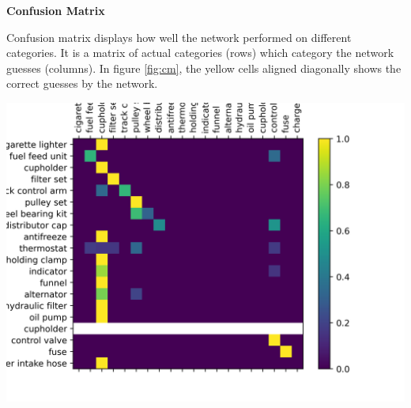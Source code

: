 \documentclass{article}
\renewcommand{\subsection}[1]{
        {\textbf{#1}}

}
\newenvironment{Figure}
  {\par\medskip\noindent\minipage{\linewidth}}
  {\endminipage\par\medskip}
\begin{document}
\begin{multicols*}{3}
    \subsection{Confusion Matrix}
    Confusion matrix displays how well the network performed on different categories. It is a matrix of actual categories (rows) which category the network guesses (columns). In figure \ref{fig:cm}, the yellow cells aligned diagonally shows the correct guesses by the network.

    \begin{Figure}
        \centering
        \includegraphics[width=0.50\linewidth]{confusion._200epoch}
        \captionsetup{font=footnotesize}
        \label{fig:cm}
    \end{Figure}

 \printbibliography



          
    
\end{multicols*}
\end{document}
